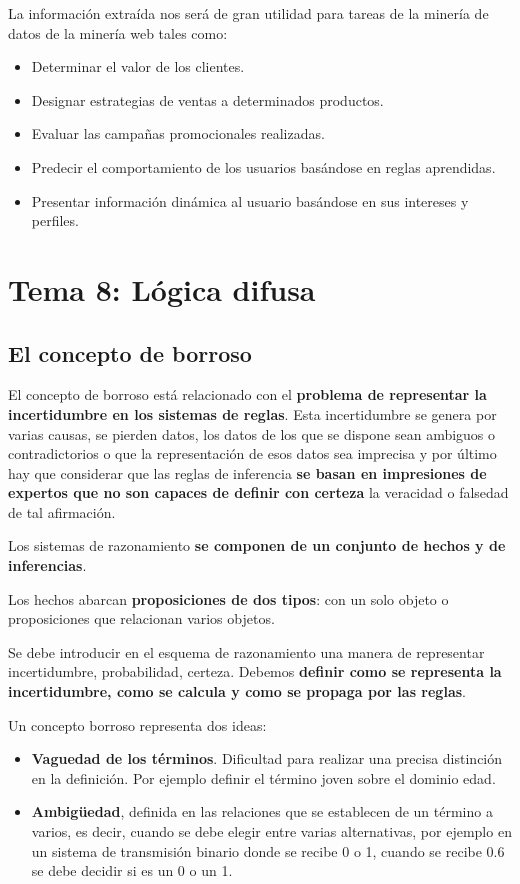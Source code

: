 \documentclass[12pt, twoside, openright]{report} %
\begin{document}
La información extraída nos será de gran utilidad para tareas de la minería de datos de la minería web tales como:
\begin{itemize}
	\item Determinar el valor de los clientes.
	\item Designar estrategias de ventas a determinados productos.
	\item Evaluar las campañas promocionales realizadas.
	\item Predecir el comportamiento de los usuarios basándose en reglas aprendidas.
	\item Presentar información dinámica al usuario basándose en sus intereses y perfiles.
\end{itemize}

\chapter{Tema 8: Lógica difusa}
\section{El concepto de borroso}
El concepto de borroso está relacionado con el \textbf{problema de representar la incertidumbre en los sistemas de reglas}. Esta incertidumbre se genera por varias causas, se pierden datos, los datos de los que se dispone sean ambiguos o contradictorios o que la representación de esos datos sea imprecisa y por último hay que considerar que las reglas de inferencia \textbf{se basan en impresiones de expertos que no son capaces de definir con certeza} la veracidad o falsedad de tal afirmación.

Los sistemas de razonamiento \textbf{se componen de un conjunto de hechos y de inferencias}. 

Los hechos abarcan \textbf{proposiciones de dos tipos}: con un solo objeto o proposiciones que relacionan varios objetos. 

Se debe introducir en el esquema de razonamiento una manera de representar incertidumbre, probabilidad, certeza. Debemos \textbf{definir como se representa la incertidumbre, como se calcula y como se propaga por las reglas}.

Un concepto borroso representa dos ideas:
\begin{itemize}
	\item \textbf{Vaguedad de los términos}. Dificultad para realizar una precisa distinción en la definición. Por ejemplo definir el término joven sobre el dominio edad.
	\item \textbf{Ambigüedad}, definida en las relaciones que se establecen de un término a varios, es decir, cuando se debe elegir entre varias alternativas, por ejemplo en un sistema de transmisión binario donde se recibe 0 o 1, cuando se recibe 0.6 se debe decidir si es un 0 o un 1.
\end{itemize}
\end{document}
